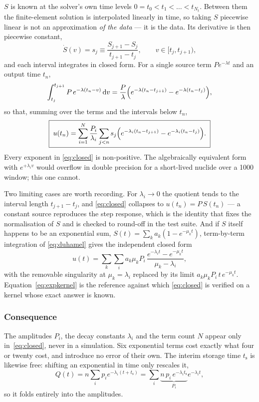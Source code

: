\documentclass[11pt,a4paper]{article}
\theoremstyle{plain}
\newcommand{\dd}{\,\mathrm{d}}
\begin{document}
$S$ is known at the solver's own time levels
$0 = t_0 < t_1 < \dots < t_{N_t}$. Between them the finite-element solution is
interpolated linearly in time, so taking $S$ piecewise linear is not an
approximation \emph{of the data} --- it is the data. Its derivative is then
piecewise constant,
\[
  \dot S(v) = s_j \equiv \frac{S_{j+1} - S_j}{t_{j+1} - t_j},
  \qquad v \in [t_j, t_{j+1}),
\]
and each interval integrates in closed form. For a single source term
$P e^{-\lambda t}$ and an output time $t_n$,
\[
  \int_{t_j}^{t_{j+1}} P\, e^{-\lambda (t_n - v)} \dd v
    = \frac{P}{\lambda}
      \Bigl( e^{-\lambda (t_n - t_{j+1})} - e^{-\lambda (t_n - t_j)} \Bigr),
\]
so that, summing over the terms and the intervals below $t_n$,
\begin{equation}
  \boxed{\;
  u(t_n) = \sum_{i=1}^{N} \frac{P_i}{\lambda_i}
           \sum_{j < n} s_j
           \Bigl( e^{-\lambda_i (t_n - t_{j+1})}
                - e^{-\lambda_i (t_n - t_j)} \Bigr). \;}
  \label{eq:closed}
\end{equation}
Every exponent in \eqref{eq:closed} is non-positive. The algebraically
equivalent form with $e^{+\lambda_i v}$ would overflow in double precision for
a short-lived nuclide over a \SI{1000}{\annum} window; this one cannot.

Two limiting cases are worth recording. For $\lambda_i \to 0$ the quotient tends
to the interval length $t_{j+1} - t_j$, and \eqref{eq:closed} collapses to
$u(t_n) = P\, S(t_n)$ --- a constant source reproduces the step response, which
is the identity that fixes the normalisation of $S$ and is checked to round-off
in the test suite. And if $S$ itself happens to be an exponential sum,
$S(t) = \sum_k a_k (1 - e^{-\mu_k t})$, term-by-term integration of
\eqref{eq:duhamel} gives the independent closed form
\begin{equation}
  u(t) = \sum_k \sum_i a_k \mu_k P_i \,
         \frac{e^{-\lambda_i t} - e^{-\mu_k t}}{\mu_k - \lambda_i},
  \label{eq:expkernel}
\end{equation}
with the removable singularity at $\mu_k = \lambda_i$ replaced by its limit
$a_k \mu_k P_i\, t\, e^{-\mu_k t}$. Equation~\eqref{eq:expkernel} is the
reference against which \eqref{eq:closed} is verified on a kernel whose exact
answer is known.

\subsubsection*{Consequence}

The amplitudes $P_i$, the decay constants $\lambda_i$ and the term count $N$
appear only in~\eqref{eq:closed}, never in a simulation. Six exponential terms
cost exactly what four or twenty cost, and introduce no error of their own. The
interim storage time $t_{\mathrm{s}}$ is likewise free: shifting an exponential
in time only rescales it,
\begin{equation}
  Q(t) = n \sum_i p_i e^{-\lambda_i (t + t_{\mathrm{s}})}
       = \sum_i \underbrace{n\, p_i\, e^{-\lambda_i t_{\mathrm{s}}}}_{P_i}
         e^{-\lambda_i t},
  \label{eq:storage}
\end{equation}
so it folds entirely into the amplitudes.
\end{document}
